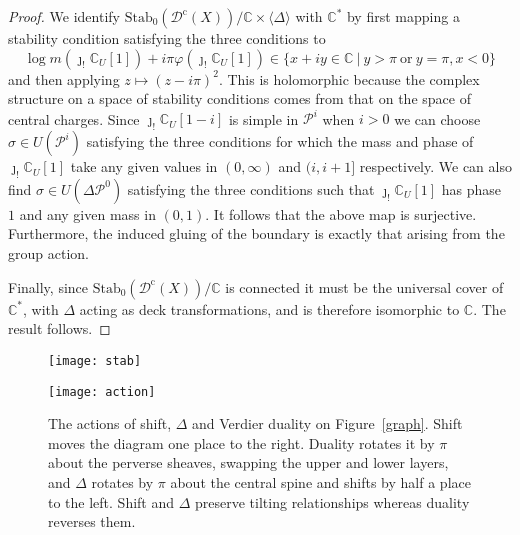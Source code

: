 \documentclass{article}
\theoremstyle{plain}
\theoremstyle{definition}
\theoremstyle{remark}
\newcommand{\C}{\mathbb{C}}
\newcommand{\cat}[1]{\mathcal{#1}}
\newcommand{\constr}[1]{\cat{D}^\textrm{c}(#1)}
\newcommand{\stabo}[1]{\mathrm{Stab}_0(#1)}
\begin{document}
\begin{proof}
We identify $\stabo{\constr{X}} / \C \times \langle\Delta\rangle$ with $\C^*$ by first mapping a stability condition satisfying the three conditions to 
$$
\log m( \jmath_!\C_U[1] ) + i \pi \varphi(\jmath_!\C_U[1] ) 
\in \{ x+iy \in \C \ | \ y>  \pi \ \textrm{or}\  y=\pi, x<0 \}
$$
and then applying $z \mapsto (z-i\pi)^2$. This is holomorphic because the complex structure on  a space of stability conditions comes from that on the space of central charges. Since $\jmath_!\C_U[1-i]$ is simple in $\cat{P}^i$ when $i>0$ we can choose $\sigma\in U(\cat{P}^i)$ satisfying the three conditions for which the mass and phase of $\jmath_!\C_U[1]$ take any given values in $(0,\infty)$ and $(i,i+1]$ respectively. We can also find $\sigma \in U(\Delta\cat{P}^0)$ satisfying the three conditions such that $\jmath_!\C_U[1]$ has phase $1$ and any given mass in $(0,1)$. It follows that the above map is surjective. Furthermore, the induced gluing of the boundary is exactly that arising from the group action. 

Finally, since $\stabo{\constr{X}}/\C$ is connected it must be the universal cover of $\C^*$, with $\Delta$ acting as deck transformations, and is therefore isomorphic to $\C$. The result follows. 
\end{proof}

\begin{figure}[htbp]
\begin{center}
\texttt{[image: stab]}
\caption{The Poincar\'e dual to the stratification of $\stabo{\constr{X}}$. Vertices correspond to open strata, equivalently to the hearts of $t$-structures. Vertices labelled by white, grey and black dots correspond to hearts equivalent to the perverse sheaves, to the constructible sheaves and to a semi-simple category respectively. Adjacent vertices are related by simple tilts, equivalently if the corresponding subsets of stability conditions share a codimension $1$ boundary stratum. Moving right corresponds to tilting right, moving left to tilting left. The $2$-cells correspond to codimension $2$ strata in the closure of the strata corresponding to their vertices and edges. The diagram shows part of one `sheet' which extends to infinity as indicated. There are countably many such sheets, joined along the central `spine', attached so that one can pass from the lower part shown to the sheet above the upper part, and so on. }
\label{graph}
\end{center}
\vspace{.25in}
\begin{center}
\texttt{[image: action]}
\caption{The actions of shift, $\Delta$ and Verdier duality on Figure~\ref{graph}. Shift moves the diagram one place to the right. Duality rotates it by $\pi$ about the perverse sheaves, swapping the upper and lower layers, and $\Delta$ rotates by $\pi$ about the central spine and shifts by half a place to the left. Shift and $\Delta$ preserve tilting relationships whereas duality reverses them. }
\label{actions}
\end{center}
\end{figure}
\end{document}
